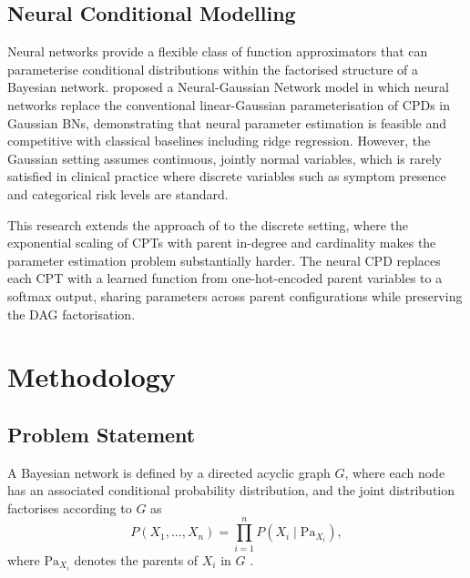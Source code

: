 \documentclass[a4paper,fleqn]{cas-dc}
\newcommand{\Pa}{\mathrm{Pa}}
\begin{document}
\subsection{Neural Conditional Modelling}

Neural networks provide a flexible class of function approximators that can parameterise conditional distributions within the factorised structure of a Bayesian network. \citet{Gaogle2026} proposed a Neural-Gaussian Network model in which neural networks replace the conventional linear-Gaussian parameterisation of CPDs in Gaussian BNs, demonstrating that neural parameter estimation is feasible and competitive with classical baselines including ridge regression. However, the Gaussian setting assumes continuous, jointly normal variables, which is rarely satisfied in clinical practice where discrete variables such as symptom presence and categorical risk levels are standard.

This research extends the approach of \citet{Gaogle2026} to the discrete setting, where the exponential scaling of CPTs with parent in-degree and cardinality makes the parameter estimation problem substantially harder. The neural CPD replaces each CPT with a learned function from one-hot-encoded parent variables to a softmax output, sharing parameters across parent configurations while preserving the DAG factorisation.

\section{Methodology}\label{sec:method}

\subsection{Problem Statement}

A Bayesian network is defined by a directed acyclic graph $G$, where each node has an associated conditional probability distribution, and the joint distribution factorises according to $G$ as
\begin{equation}
P(X_1,\dots,X_n)=\prod_{i=1}^{n} P(X_i\mid\Pa_{X_i}),
\end{equation}
where $\Pa_{X_i}$ denotes the parents of $X_i$ in $G$ \citep{koller2007graphical}.
\end{document}
